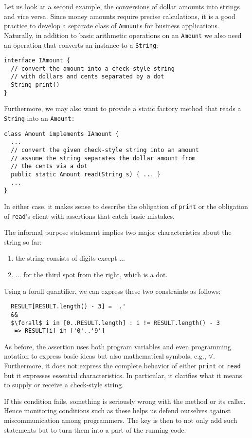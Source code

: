 \documentclass[11pt]{article}
\begin{document}
Let us look at a second example, the conversions of dollar amounts into
strings and vice versa. Since money amounts require precise calculations, it is
a good practice to develop a separate class of {\tt Amount}s for business
applications. Naturally, in addition to basic arithmetic operations on an
{\tt Amount} we also need an operation that converts an instance to a
{\tt String}:
\begin{verbatim}
interface IAmount {
  // convert the amount into a check-style string 
  // with dollars and cents separated by a dot 
  String print() 
}
\end{verbatim}

Furthermore, we may also want to provide a static factory method that reads a
{\tt String} into an {\tt Amount:}
\begin{verbatim}
class Amount implements IAmount {
  ...
  // convert the given check-style string into an amount
  // assume the string separates the dollar amount from 
  // the cents via a dot 
  public static Amount read(String s) { ... }
  ...
}
\end{verbatim}

In either case, it makes sense to describe the obligation of {\tt print}
or the obligation of {\tt read}'s client with assertions that catch basic
mistakes.


The informal purpose statement implies two major characteristics about the
string so far: 
\begin{enumerate}
\item the string consists of digits except ...
\item ... for the third spot from the right, which is a dot.
\end{enumerate}
Using a forall quantifier, we can express these two constraints as follows: 
\begin{verbatim}
  RESULT[RESULT.length() - 3] = '.' 
  &&
  $\forall$ i in [0..RESULT.length] : i != RESULT.length() - 3 
   => RESULT[i] in ['0'..'9']
\end{verbatim}

As before, the assertion uses both program variables and even programming
notation to express basic ideas but also mathematical symbols, e.g.,
$\forall$. Furthermore, it does not express the complete behavior of either
{\tt print} or {\tt read} but it expresses essential
characteristics. In particular, it clarifies what it means to supply or receive
a check-style string. 


If this condition fails, something is seriously wrong with the method or its
caller. Hence monitoring conditions such as these helps us defend ourselves
against miscommunication among programmers. The key is then to not only add such
statements but to turn them into a part of the running code.
\end{document}
